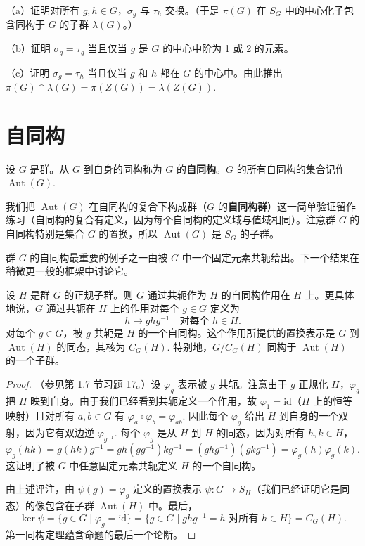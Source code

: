 \begin{enumerate}
（a）证明对所有 \(g, h \in G\)，\(\sigma_g\) 与 \(\tau_h\) 交换。（于是 \(\pi(G)\) 在 \(S_G\) 中的中心化子包含同构于 \(G\) 的子群 \(\lambda(G)\)。）

（b）证明 \(\sigma_g = \tau_g\) 当且仅当 \(g\) 是 \(G\) 的中心中阶为 1 或 2 的元素。

（c）证明 \(\sigma_g = \tau_h\) 当且仅当 \(g\) 和 \(h\) 都在 \(G\) 的中心中。由此推出 \(\pi(G) \cap \lambda(G) = \pi(Z(G)) = \lambda(Z(G))\).
\end{enumerate}

\section{自同构}

\begin{definition}
设 \(G\) 是群。从 \(G\) 到自身的同构称为 \(G\) 的\textbf{自同构}。\(G\) 的所有自同构的集合记作 \(\operatorname{Aut}(G)\).
\end{definition}

我们把 \(\operatorname{Aut}(G)\) 在自同构的复合下构成群（\(G\) 的\textbf{自同构群}）这一简单验证留作练习（自同构的复合有定义，因为每个自同构的定义域与值域相同）。注意群 \(G\) 的自同构特别是集合 \(G\) 的置换，所以 \(\operatorname{Aut}(G)\) 是 \(S_G\) 的子群。

群 \(G\) 的自同构最重要的例子之一由被 \(G\) 中一个固定元素共轭给出。下一个结果在稍微更一般的框架中讨论它。

\begin{proposition}\label{pro:4.13}
设 \(H\) 是群 \(G\) 的正规子群。则 \(G\) 通过共轭作为 \(H\) 的自同构作用在 \(H\) 上。更具体地说，\(G\) 通过共轭在 \(H\) 上的作用对每个 \(g \in G\) 定义为
\[
h \mapsto ghg^{-1} \quad \text{对每个 } h \in H.
\]
对每个 \(g \in G\)，被 \(g\) 共轭是 \(H\) 的一个自同构。这个作用所提供的置换表示是 \(G\) 到 \(\operatorname{Aut}(H)\) 的同态，其核为 \(C_G(H)\). 特别地，\(G/C_G(H)\) 同构于 \(\operatorname{Aut}(H)\) 的一个子群。
\end{proposition}

\begin{proof}
（参见第 1.7 节习题 17。）设 \(\varphi_g\) 表示被 \(g\) 共轭。注意由于 \(g\) 正规化 \(H\)，\(\varphi_g\) 把 \(H\) 映到自身。由于我们已经看到共轭定义一个作用，故 \(\varphi_1 = \mathrm{id}\)（\(H\) 上的恒等映射）且对所有 \(a, b \in G\) 有 \(\varphi_a \circ \varphi_b = \varphi_{ab}\). 因此每个 \(\varphi_g\) 给出 \(H\) 到自身的一个双射，因为它有双边逆 \(\varphi_{g^{-1}}\). 每个 \(\varphi_g\) 是从 \(H\) 到 \(H\) 的同态，因为对所有 \(h, k \in H\)，
\[
\varphi_g(hk) = g(hk)g^{-1} = gh(gg^{-1})kg^{-1} = (ghg^{-1})(gkg^{-1}) = \varphi_g(h)\varphi_g(k).
\]
这证明了被 \(G\) 中任意固定元素共轭定义 \(H\) 的一个自同构。

由上述评注，由 \(\psi(g) = \varphi_g\) 定义的置换表示 \(\psi : G \to S_H\)（我们已经证明它是同态）的像包含在子群 \(\operatorname{Aut}(H)\) 中。最后，
\[
\ker \psi = \{g \in G \mid \varphi_g = \mathrm{id}\} = \{g \in G \mid ghg^{-1} = h \text{ 对所有 } h \in H\} = C_G(H).
\]
第一同构定理蕴含命题的最后一个论断。
\end{proof}

